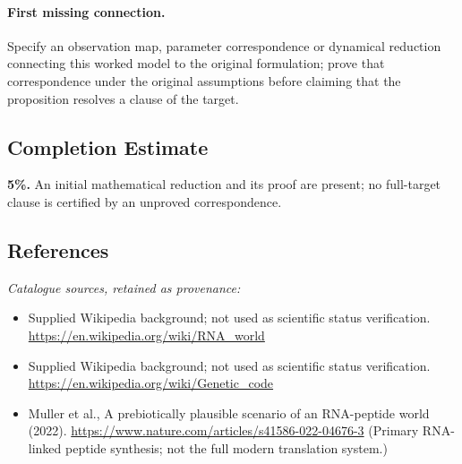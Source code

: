 \documentclass[11pt]{article}
\begin{document}
\paragraph{First missing connection.} Specify an observation map, parameter correspondence or dynamical reduction connecting this worked model to the original formulation; prove that correspondence under the original assumptions before claiming that the proposition resolves a clause of the target.
\subsection{Completion Estimate}
\textbf{5\%.} An initial mathematical reduction and its proof are present; no full-target clause is certified by an unproved correspondence.
\subsection{References}
\noindent\emph{Catalogue sources, retained as provenance:}
\begin{itemize}
\item Supplied Wikipedia background; not used as scientific status verification. \url{https://en.wikipedia.org/wiki/RNA_world}
\item Supplied Wikipedia background; not used as scientific status verification. \url{https://en.wikipedia.org/wiki/Genetic_code}
\item Muller et al., A prebiotically plausible scenario of an RNA-peptide world (2022). \url{https://www.nature.com/articles/s41586-022-04676-3} (Primary RNA-linked peptide synthesis; not the full modern translation system.)
\end{itemize}
\end{document}

